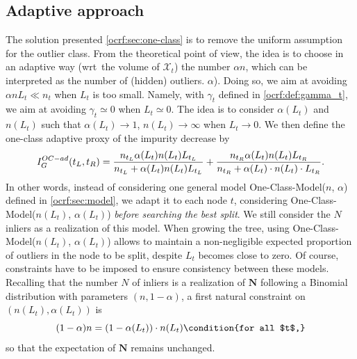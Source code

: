 \subsection{Adaptive approach}
The solution presented \cref{ocrf:sec:one-class} is to remove the uniform
assumption for the outlier class. From the theoretical point of view, the idea
is to choose in an adaptive way (\acs{wrt}~the volume of $\mathcal{X}_t$) the
number $\alpha n$, which can be interpreted as the number of (hidden) outliers.
$\alpha$).  Doing so, we aim at avoiding $\alpha n L_t \ll n_t$ when $L_t$ is
too small. Namely, with $\gamma_t$ defined in \cref{ocrf:def:gamma_t}, we aim
at avoiding $\gamma_t \simeq 0$ when $L_t \simeq 0$. The idea is to consider
$\alpha(L_t)$ and $n(L_t)$ such that $\alpha(L_t) \to 1$, $n(L_t) \to \infty$
when $L_t \to 0$.  We then define the one-class adaptive proxy of the impurity
decrease by
\begin{dmath}
    \label{ocrf:oc_proxy_ad1}
    \nonumber I_G^{OC-ad}(t_L, t_R) = \frac{n_{t_L}\alpha(L_t) n(L_t)
    L_{t_L}}{n_{t_L} + \alpha(L_t) n(L_t) L_{t_L}} \\ +
    \frac{n_{t_R}\alpha(L_t) n(L_t) L_{t_R}}{n_{t_R} + \alpha(L_t)
    \cdot n(L_t) \cdot L_{t_R}}.
\end{dmath}
In other words, instead of considering one general model One-Class-Model($n$,
$\alpha$) defined in \cref{ocrf:sec:model}, we adapt it to each node $t$,
considering One-Class-Model($n(L_t)$, $\alpha(L_t)$) \emph{before searching the
best split}. We still consider the $N$ inliers as a realization of this model.
When growing the tree, using One-Class-Model($n(L_t)$, $\alpha(L_t)$) allows to
maintain a non-negligible expected proportion of outliers in the node to be
split, 
despite $L_t$ becomes close to zero.  Of course, constraints have to be imposed
to ensure consistency between these models.
%
Recalling that the number $N$ of inliers is a realization of $\mathbf{N}$
following a Binomial distribution with parameters $(n, 1-\alpha)$, a first
natural constraint on $\left(n(L_t), \alpha(L_t)\right)$ is
\begin{dmath}
    \label{ocrf:constraint1}
    (1-\alpha)n = \left(1-\alpha(L_t)\right) \cdot n(L_t) \condition{for all
    $t$,}
\end{dmath}
so that the expectation of $\mathbf{N}$ remains unchanged. 
